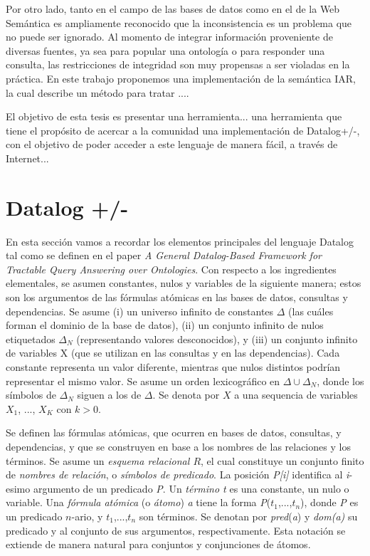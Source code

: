 \documentclass[11pt,a4paper,twoside]{tesis}
\begin{document}
Por otro lado, tanto en el campo de las bases de datos como en el de la Web Semántica es ampliamente reconocido que la inconsistencia es un problema que no puede ser ignorado. Al momento de integrar información proveniente de diversas fuentes, ya sea para popular una ontología o para responder una consulta, las restricciones de integridad son muy propensas a ser violadas en la práctica. En este trabajo proponemos una implementación de la semántica IAR, la cual describe un método para tratar ....

El objetivo de esta tesis es presentar una herramienta... una herramienta que tiene el propósito de acercar a la comunidad una implementación de Datalog+/-, con el objetivo de poder acceder a este lenguaje de manera fácil, a través de Internet...

\section{Datalog +/-}\label{seccion_datalog}

En esta sección vamos a recordar los elementos principales del lenguaje Datalog tal como se definen en el paper \textit{A General Datalog-Based Framework for
Tractable Query Answering over Ontologies}\cite{JWS}.
Con respecto a los ingredientes elementales, se asumen constantes, nulos y variables de la siguiente manera; estos son los argumentos de las fórmulas atómicas en las bases de datos, consultas y dependencias.
Se asume (i) un universo infinito de constantes  $\Delta$ (las cuáles forman el dominio de la base de  datos), (ii) un conjunto infinito de nulos etiquetados $\Delta_{N}$ (representando valores desconocidos), y (iii) un conjunto infinito de variables X (que se utilizan en las consultas y en las dependencias). Cada constante representa un valor diferente, mientras que nulos distintos podrían representar el mismo valor. 
Se asume un orden lexicográfico en  $\Delta \cup \Delta_{N}$, donde los símbolos de $\Delta_{N}$ siguen a los de $\Delta$. Se denota por $X$ a una sequencia de variables $X_{1}$, ..., $X_{K}$ con $k > 0$.

Se definen las fórmulas atómicas, que ocurren en bases de datos, consultas, y dependencias, y que se construyen en base a los nombres de las relaciones y los términos. Se asume un \textit{esquema relacional $R$}, el cual constituye un conjunto finito de \textit{nombres de relación}, o \textit{símbolos de predicado}. La posición \textit{P[i]} identifica al \textit{i}-esimo argumento de un predicado \textit{P}. Un \textit{término t} es una constante, un nulo o variable. Una \textit{fórmula atómica} (o \textit{átomo}) \textit{a} tiene la forma \textit{P}($t_{1}$,...,$t_{n}$), donde \textit{P} es un predicado $n$-ario, y $t_{1}$,...,$t_{n}$ son términos. Se denotan por \textit{pred}(\textit{a}) y \textit{dom(a)} su predicado y al conjunto de sus argumentos, respectivamente. Esta notación se extiende de manera natural para conjuntos y conjunciones de átomos. 
\end{document}
